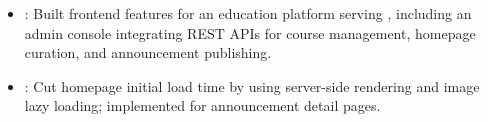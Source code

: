\begin{itemize}
  \item {}: Built  frontend features for an education platform serving , including an admin console integrating REST APIs for course management, homepage curation, and announcement publishing.
  \item {}: Cut homepage initial load time by  using server-side rendering and image lazy loading; implemented  for announcement detail pages.
\end{itemize}
